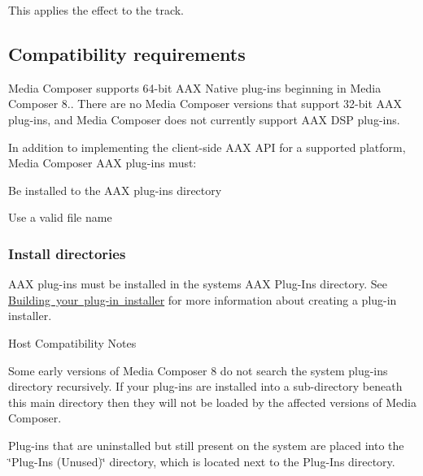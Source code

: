 This applies the effect to the track.



 \hypertarget{a00831_aax_media_composer_guide__requirements}{}\subsection{Compatibility requirements}\label{a00831_aax_media_composer_guide__requirements}
 Media Composer supports 64-\/bit A\+AX Native plug-\/ins beginning in Media Composer 8.. There are no Media Composer versions that support 32-\/bit A\+AX plug-\/ins, and Media Composer does not currently support A\+AX D\+SP plug-\/ins.

In addition to implementing the client-\/side A\+AX A\+PI for a supported platform, Media Composer A\+AX plug-\/ins must\+: 
\begin{DoxyEnumerate}
\item Be installed to the A\+AX plug-\/ins directory  
\item Use a valid file name 
\end{DoxyEnumerate}

\hypertarget{a00831_subsection__media_composer_guide__install_directories}{}\subsubsection{Install directories}\label{a00831_subsection__media_composer_guide__install_directories}
 A\+AX plug-\/ins must be installed in the system\textquotesingle{}s A\+AX Plug-\/\+Ins directory. See \mbox{\hyperlink{a00843_aax_distributing_installer}{Building your plug-\/in installer}} for more information about creating a plug-\/in installer.

 \begin{DoxyRefDesc}{Host Compatibility Notes}
\item[\mbox{\hyperlink{a00786__compatibility_notes000008}{Host Compatibility Notes}}]Some early versions of Media Composer 8 do not search the system plug-\/ins directory recursively. If your plug-\/ins are installed into a sub-\/directory beneath this main directory then they will not be loaded by the affected versions of Media Composer.\end{DoxyRefDesc}


Plug-\/ins that are uninstalled but still present on the system are placed into the \char`\"{}\+Plug-\/\+Ins (\+Unused)\char`\"{} directory, which is located next to the Plug-\/\+Ins directory.

